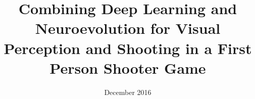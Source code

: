 \documentclass{thesis-document-class}
\title{Combining Deep Learning and Neuroevolution for Visual Perception and Shooting in a First Person Shooter Game}
\date{December 2016}
\begin{document}
	\maketitle
	
	\pagestyle{plain}
	
	
	\newpage
	
	\tableofcontents
	
	\clearpage
	\renewcommand{\listfigurename}{List of Figures and Plots}
	\listoffigures
	
	\listoftables
	\newpage
	
	\setcounter{page}{1}
	\pagestyle{fancy}

	
	
	
    
	
	
	
    
    
    
	
	\newpage
	
	\begin{appendices}
		
	\end{appendices}
	
	\clearpage
	
	
\end{document}

